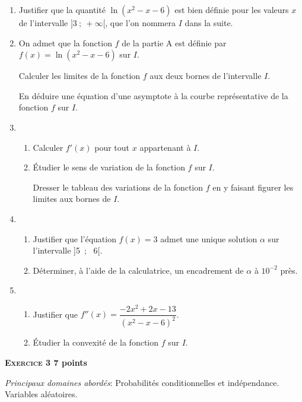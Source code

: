 \documentclass[10pt,a4paper]{article}
\begin{document}
\begin{enumerate}
\item Justifier que la quantité $\ln \left(x^2- x- 6\right)$ est bien définie pour les valeurs $x$ de l'intervalle $]3~;~ +\infty[$, que l'on nommera $I$ dans la suite.
\item On admet que la fonction $f$ de la partie A est définie par $f(x) = \ln \left(x^2- x- 6\right)$ sur $I$. 

Calculer les limites de la fonction $f$ aux deux bornes de l'intervalle $I$.

En déduire une équation d'une asymptote à la courbe représentative de la fonction $f$ sur $I$.
\item 
	\begin{enumerate}
		\item Calculer $f'(x)$ pour tout $x$ appartenant à $I$.
		\item Étudier le sens de variation de la fonction $f$ sur $I$.
		
Dresser le tableau des variations de la fonction $f$ en y faisant figurer les limites aux bornes de $I$.
	\end{enumerate}
\item 
	\begin{enumerate}
		\item Justifier que l'équation $f(x) = 3$ admet une unique solution $\alpha$ sur l'intervalle ]5~;~ 6[.
		\item Déterminer, à l'aide de la calculatrice, un encadrement de $\alpha$ à $10^{-2}$ près.
	\end{enumerate}
\item 
	\begin{enumerate}
		\item Justifier que $f''(x) = \dfrac{- 2x^2 + 2x - 13}{\left(x^2 - x - 6\right)^2}$.
		\item Étudier la convexité de la fonction $f$ sur $I$.
	\end{enumerate}
\end{enumerate}

\bigskip

\textbf{\textsc{Exercice 3} \hfill 7 points}

\medskip

\emph{Principaux domaines abordés}: Probabilités conditionnelles et indépendance. Variables aléatoires.
\end{document}
